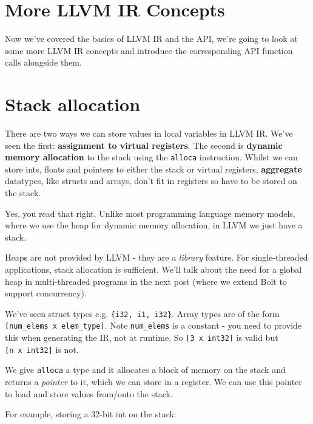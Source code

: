 \hypertarget{more-llvm-ir-concepts}{%
\section{\texorpdfstring{\protect\hyperlink{more-llvm-ir-concepts}{}More
LLVM IR Concepts}{More LLVM IR Concepts}}\label{more-llvm-ir-concepts}}

Now we've covered the basics of LLVM IR and the API, we're going to look
at some more LLVM IR concepts and introduce the corresponding API
function calls alongside them.

\hypertarget{stack-allocation}{%
\section{\texorpdfstring{\protect\hyperlink{stack-allocation}{}Stack
allocation}{Stack allocation}}\label{stack-allocation}}

There are two ways we can store values in local variables in LLVM IR.
We've seen the first: \textbf{assignment to virtual registers}. The
second is \textbf{dynamic memory allocation} to the stack using the
\texttt{alloca} instruction. Whilst we can store ints, floats and
pointers to either the stack or virtual registers, \textbf{aggregate}
datatypes, like structs and arrays, don't fit in registers so have to be
stored on the stack.

Yes, you read that right. Unlike most programming language memory
models, where we use the heap for dynamic memory allocation, in LLVM we
just have a stack.

Heaps are not provided by LLVM - they are a \emph{library} feature. For
single-threaded applications, stack allocation is sufficient. We'll talk
about the need for a global heap in multi-threaded programs in the next
post (where we extend Bolt to support concurrency).

We've seen struct types e.g. \texttt{\{i32,\ i1,\ i32\}}. Array types
are of the form \texttt{{[}num\_elems\ x\ elem\_type{]}}. Note
\texttt{num\_elems} is a constant - you need to provide this when
generating the IR, not at runtime. So \texttt{{[}3\ x\ int32{]}} is
valid but \texttt{{[}n\ x\ int32{]}} is not.

We give \texttt{alloca} a type and it allocates a block of memory on the
stack and returns a \emph{pointer} to it, which we can store in a
register. We can use this pointer to load and store values from/onto the
stack.

For example, storing a 32-bit int on the stack:

